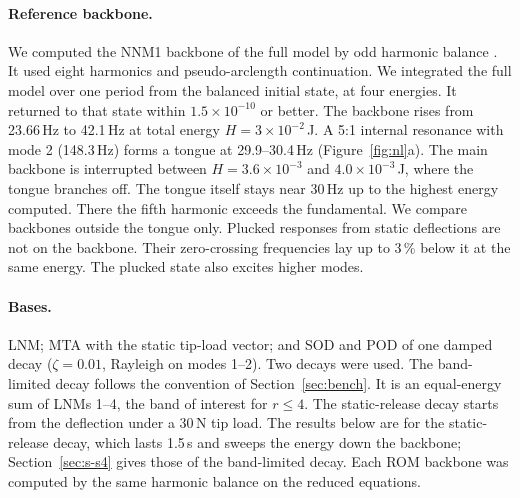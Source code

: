 \documentclass[preprint,12pt]{elsarticle}
\begin{document}
\paragraph{Reference backbone.} We computed the NNM1 backbone \citep{Kerschen2009} of the full model by odd harmonic balance \citep{Detroux2015}. It used eight harmonics and pseudo-arclength continuation.
We integrated the full model over one period from the balanced initial state, at four energies. It returned to that state within $1.5\times10^{-10}$ or better.
The backbone rises from 23.66\,Hz to 42.1\,Hz at total energy $H=3\times10^{-2}$\,J.
A 5:1 internal resonance with mode 2 (148.3\,Hz) forms a tongue at 29.9--30.4\,Hz (Figure~\ref{fig:nl}a). The main backbone is interrupted between $H=3.6\times10^{-3}$ and $4.0\times10^{-3}$\,J, where the tongue branches off. The tongue itself stays near 30\,Hz up to the highest energy computed.
There the fifth harmonic exceeds the fundamental. We compare backbones outside the tongue only.
Plucked responses from static deflections are not on the backbone. Their zero-crossing frequencies lay up to 3\,\% below it at the same energy. The plucked state also excites higher modes.

\paragraph{Bases.} LNM; MTA with the static tip-load vector; and SOD and POD of one damped decay ($\zeta=0.01$, Rayleigh on modes 1--2). Two decays were used. The band-limited decay follows the convention of Section~\ref{sec:bench}. It is an equal-energy sum of LNMs 1--4, the band of interest for $r\le4$. The static-release decay starts from the deflection under a 30\,N tip load. The results below are for the static-release decay, which lasts 1.5\,s and sweeps the energy down the backbone; Section~\ref{sec:s-s4} gives those of the band-limited decay.
Each ROM backbone was computed by the same harmonic balance on the reduced equations.
\end{document}
